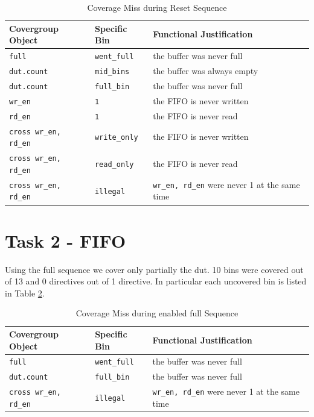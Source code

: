 \begin{table}[H]
	\centering
	\begin{tabular}{@{}lll@{}}
		\toprule
		\textbf{Covergroup Object} 		& \textbf{Specific Bin} & \textbf{Functional Justification} 					\\ \midrule
		\texttt{full}              		& \texttt{went\_full}  	& the buffer was never full     						\\
		\texttt{dut.count}              & \texttt{mid\_bins}  	& the buffer was always empty   						\\
		\texttt{dut.count}           	& \texttt{full\_bin}   	& the buffer was never full 							\\
		\texttt{wr\_en}              	& \texttt{1}        	& the FIFO is never written 							\\
		\texttt{rd\_en}              	& \texttt{1}  			& the FIFO is never read 								\\
		\texttt{cross wr\_en, rd\_en}   & \texttt{write\_only} 	& the FIFO is never written 							\\
		\texttt{cross wr\_en, rd\_en}   & \texttt{read\_only}  	& the FIFO is never read 								\\
		\texttt{cross wr\_en, rd\_en}   & \texttt{illegal}     	& \texttt{wr\_en, rd\_en} were never 1 at the same time \\ \bottomrule
	\end{tabular}
	\caption{Coverage Miss during Reset Sequence}
	\label{tab:reset_coverage}
\end{table}

\section{Task 2 - FIFO}

Using the full sequence we cover only partially the dut.
10 bins were covered out of 13 and 0 directives out of 1 directive.
In particular each uncovered bin is listed in Table \ref{tab:stimulus_coverage}.


\begin{table}[H]
	\centering
	\begin{tabular}{@{}lll@{}}
		\toprule
		\textbf{Covergroup Object} 		& \textbf{Specific Bin}	& \textbf{Functional Justification} \\ \midrule
		\texttt{full}              		& \texttt{went\_full}  	& the buffer was never full \\
		\texttt{dut.count}           	& \texttt{full\_bin}   	& the buffer was never full \\
		\texttt{cross wr\_en, rd\_en}   & \texttt{illegal}     	& \texttt{wr\_en, rd\_en} were never 1 at the same time\\ \bottomrule
	\end{tabular}
	\caption{Coverage Miss during enabled full Sequence}
	\label{tab:stimulus_coverage}
\end{table}

